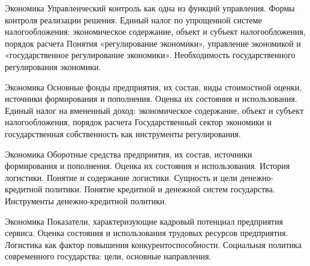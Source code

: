 \documentclass[
	11pt,
	a4paper,
	]
	{article}
\begin{document}
\begin{minipage}[t][\miniH]{\miniL}\centering
	 {Экономика}
		{
			Управленческий контроль как одна из функций управления. Формы контроля реализации решения.
		}{
			Единый налог по упрощенной системе налогообложения: экономическое содержание, объект и субъект налогообложения, порядок расчета
		}{
			Понятия «регулирование экономики», управление экономикой и «государственное регулирование экономики». Необходимость государственного регулирования экономики.
		}
	\lowGE
\end{minipage}

\vfill



\begin{minipage}[t][\miniH]{\miniL}\centering
	 {Экономика}
		{
			Основные фонды предприятия, их состав, виды стоимостной оценки, источники формирования и пополнения. Оценка их состояния и использования.
		}{
			Единый налог на вмененный доход: экономическое содержание, объект и субъект налогообложения, порядок расчета
		}{
			Государственный сектор экономики и государственная собственность как инструменты регулирования.
		}
	\lowGE
\end{minipage}

\vfill



\begin{minipage}[t][\miniH]{\miniL}\centering
	 {Экономика}
		{
			Оборотные средства предприятия, их состав, источники формирования и пополнения. Оценка их состояния и использования.
		}{
			История логистики. Понятие и содержание логистики.
		}{
			Сущность и цели денежно-кредитной политики. Понятие кредитной и денежной систем государства. Инструменты денежно-кредитной политики.
		}
	\lowGE
\end{minipage}





\begin{minipage}[t][\miniH]{\miniL}\centering
	 {Экономика}
		{
			Показатели, характеризующие кадровый потенциал предприятия сервиса. Оценка состояния и использования трудовых ресурсов предприятия.
		}{
			Логистика как фактор повышения конкурентоспособности.
		}{
			Социальная политика современного государства: цели, основные направления.
		}
	\lowGE
\end{minipage}
\end{document}
